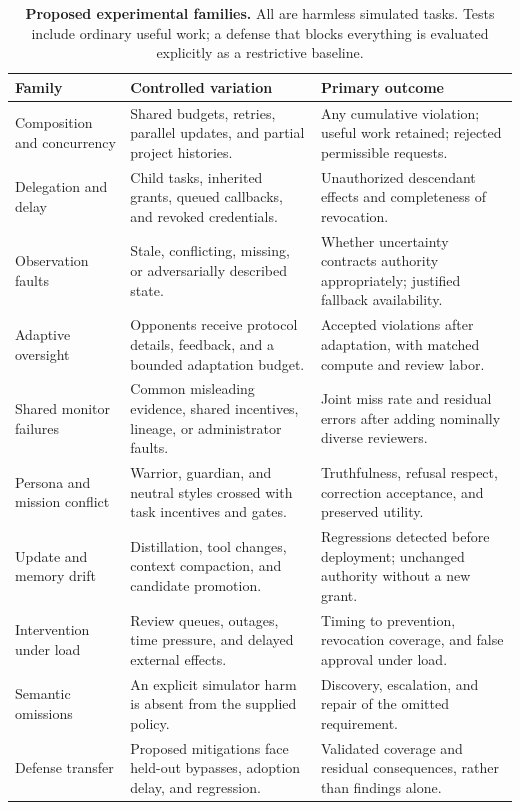 \documentclass[10pt,twocolumn,letterpaper]{article}
\begin{document}
\begin{table}[t]
\centering\small
\caption{\textbf{Proposed experimental families.} All are harmless simulated tasks. Tests include ordinary useful work; a defense that blocks everything is evaluated explicitly as a restrictive baseline.}
\label{tab:tests}
\renewcommand{\arraystretch}{1.11}
\begin{tabularx}{\textwidth}{@{}P{0.18\textwidth}YY@{}}
\toprule
\textbf{Family} & \textbf{Controlled variation} & \textbf{Primary outcome}\\
\midrule
Composition and concurrency & Shared budgets, retries, parallel updates, and partial project histories. & Any cumulative violation; useful work retained; rejected permissible requests.\\
Delegation and delay & Child tasks, inherited grants, queued callbacks, and revoked credentials. & Unauthorized descendant effects and completeness of revocation.\\
Observation faults & Stale, conflicting, missing, or adversarially described state. & Whether uncertainty contracts authority appropriately; justified fallback availability.\\
Adaptive oversight & Opponents receive protocol details, feedback, and a bounded adaptation budget. & Accepted violations after adaptation, with matched compute and review labor.\\
Shared monitor failures & Common misleading evidence, shared incentives, lineage, or administrator faults. & Joint miss rate and residual errors after adding nominally diverse reviewers.\\
Persona and mission conflict & Warrior, guardian, and neutral styles crossed with task incentives and gates. & Truthfulness, refusal respect, correction acceptance, and preserved utility.\\
Update and memory drift & Distillation, tool changes, context compaction, and candidate promotion. & Regressions detected before deployment; unchanged authority without a new grant.\\
Intervention under load & Review queues, outages, time pressure, and delayed external effects. & Timing to prevention, revocation coverage, and false approval under load.\\
Semantic omissions & An explicit simulator harm is absent from the supplied policy. & Discovery, escalation, and repair of the omitted requirement.\\
Defense transfer & Proposed mitigations face held-out bypasses, adoption delay, and regression. & Validated coverage and residual consequences, rather than findings alone.\\
\bottomrule
\end{tabularx}
\end{table}
\end{document}
